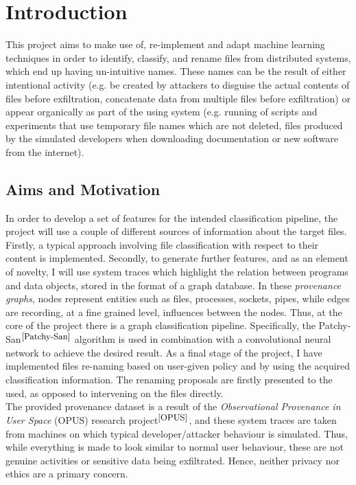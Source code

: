 

\chapter{Introduction}

This project aims to make use of, re-implement and adapt machine learning techniques in order to identify, classify, and rename files from distributed systems, which end up having un-intuitive names. These names can be the result of either intentional activity (e.g. be created by attackers to disguise the actual contents of files before exfiltration, concatenate data from multiple files before exfiltration) or appear organically as part of the using system (e.g. running of scripts and experiments that use temporary file names which are not deleted, files produced by the simulated developers when downloading documentation or new software from the internet). 


\section{Aims and Motivation}  \label{1.1}

In order to develop a set of features for the intended classification pipeline, the project will use a couple of different sources of information about the target files. Firstly, a typical approach involving file classification with respect to their content is implemented. Secondly, to generate further features, and as an element of novelty, I will use system traces which highlight the relation between programs and data objects, stored in the format of a graph database. In these \textit{provenance graphs}, nodes represent entities such as files, processes, sockets, pipes, while edges are recording, at a fine grained level, influences between the nodes. Thus, at the core of the project there is a graph classification pipeline. Specifically, the Patchy-San$^{\small \cite{Patchy-San}}$ algorithm is used in combination with a convolutional neural network to achieve the desired result. As a final stage of the project, I have implemented files re-naming based on user-given policy and by using the acquired classification information. The renaming proposals are firstly presented to the used, as opposed to intervening on the files directly. \\

The provided provenance dataset is a result of the \textit{Observational Provenance in User Space} (OPUS) research project$^{\small \cite{OPUS}}$, and these system traces are taken from machines on which typical developer/attacker behaviour is simulated. Thus, while everything is made to look similar to normal user behaviour, these are not genuine activities or sensitive data being exfiltrated. Hence, neither privacy nor ethics are a primary concern. \\

